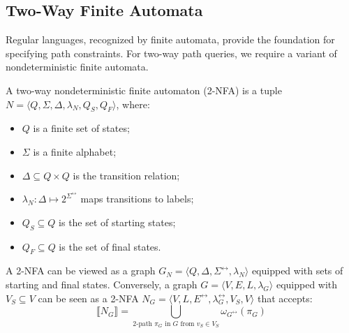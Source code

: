 \subsection{Two-Way Finite Automata}

Regular languages, recognized by finite automata, provide the foundation for specifying path constraints. For two-way path queries, we require a variant of nondeterministic finite automata.

\begin{definition}
	A two-way nondeterministic finite automaton (2-NFA) is a tuple $N = \langle Q, \Sigma, \Delta, \lambda_N, Q_S, Q_F \rangle$, where:
	\begin{itemize}
		\item $Q$ is a finite set of states;
		\item $\Sigma$ is a finite alphabet;
		\item $\Delta \subseteq Q \times Q$ is the transition relation;
		\item $\lambda_N: \Delta \mapsto 2^{\Sigma^\leftrightarrow}$ maps transitions to labels;
		\item $Q_S \subseteq Q$ is the set of starting states;
		\item $Q_F \subseteq Q$ is the set of final states.
	\end{itemize}
\end{definition}


A 2-NFA can be viewed as a graph $G_N = \langle Q, \Delta, \Sigma^\leftrightarrow, \lambda_N \rangle$ equipped with sets of starting and final states. Conversely, a graph $G = \langle V, E, L, \lambda_G \rangle$ equipped with $V_S \subseteq V$ can be seen as a 2-NFA $N_G = \langle V, L, E^\leftrightarrow, \lambda_G^\leftrightarrow, V_S, V \rangle$ that accepts:
$$ \llbracket N_G \rrbracket = \bigcup_{\text{2-path } \pi_G \text{ in } G \text{ from } v_S \in V_S} \omega_{G^\leftrightarrow}(\pi_G) $$


